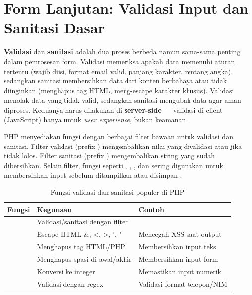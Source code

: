 \section{Form Lanjutan: Validasi Input dan Sanitasi Dasar}

\textbf{Validasi} dan \textbf{sanitasi} adalah dua proses berbeda namun sama-sama penting dalam pemrosesan form. Validasi memeriksa apakah data memenuhi aturan tertentu (wajib diisi, format email valid, panjang karakter, rentang angka), sedangkan sanitasi membersihkan data dari konten berbahaya atau tidak diinginkan (menghapus tag HTML, meng-escape karakter khusus). Validasi menolak data yang tidak valid, sedangkan sanitasi mengubah data agar aman diproses. Keduanya harus dilakukan di \textbf{server-side} --- validasi di client (JavaScript) hanya untuk \textit{user experience}, bukan keamanan \cite{phpManual}.

PHP menyediakan fungsi  dengan berbagai filter bawaan untuk validasi dan sanitasi. Filter validasi (prefix ) mengembalikan nilai yang divalidasi atau  jika tidak lolos. Filter sanitasi (prefix ) mengembalikan string yang sudah dibersihkan. Selain filter, fungsi seperti , , , dan  sering digunakan untuk membersihkan input sebelum ditampilkan atau disimpan \cite{phpRightWay}.

\begin{table}[ht]
\centering
\small
\begin{tabular}{|P{1.8cm}|P{3.5cm}|P{3.5cm}|}
\hline
\textbf{Fungsi} & \textbf{Kegunaan} & \textbf{Contoh} \\
\hline
{} & Validasi/sanitasi dengan filter & \linebreak[0] \\
\hline
{} & Escape HTML \&, <, >, ', " & Mencegah XSS saat output \\
\hline
{} & Menghapus tag HTML/PHP & Membersihkan input teks \\
\hline
{} & Menghapus spasi di awal/akhir & Membersihkan input form \\
\hline
{} & Konversi ke integer & Memastikan input numerik \\
\hline
{} & Validasi dengan regex & Validasi format telepon/NIM \\
\hline
\end{tabular}
\caption{Fungsi validasi dan sanitasi populer di PHP}
\end{table}

